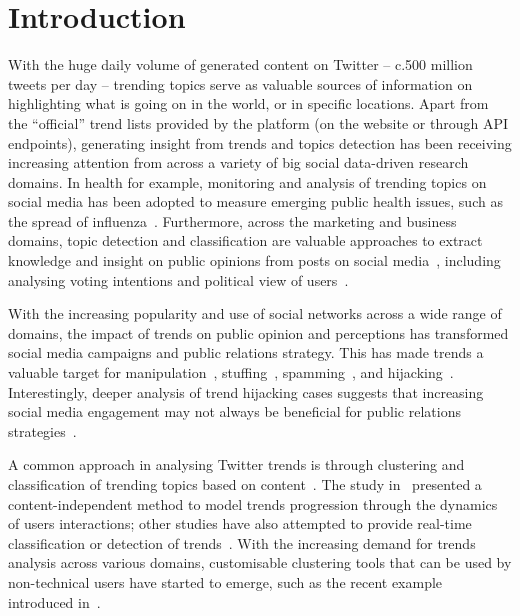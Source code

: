 \documentclass{llncs}
\begin{document}
\section{Introduction}\label{intro}

With the huge daily volume of generated content on Twitter -- c.500
million tweets per day -- trending topics serve as valuable sources of
information on highlighting what is going on in the world, or in
specific locations. Apart from the ``official'' trend lists provided
by the platform (on the website or through API endpoints), generating
insight from trends and topics detection has been receiving increasing
attention from across a variety of big social data-driven research
domains. In health for example, monitoring and analysis of trending
topics on social media has been adopted to measure emerging public
health issues, such as the spread of
influenza~\cite{Achrekar2011,Parker2013,Parker2015}. Furthermore,
across the marketing and business domains, topic detection and
classification are valuable approaches to extract knowledge and
insight on public opinions from posts on social
media~\cite{blamey-et-al-2012,Bello2013,albishry-et-al:ssei2018},
including analysing voting intentions and political view of
users~\cite{Fang2015}.

With the increasing popularity and use of social networks across a
wide range of domains, the impact of trends on public opinion and
perceptions has transformed social media campaigns and public
relations strategy. This has made trends a valuable target for
manipulation~\cite{Zhang2017}, stuffing~\cite{Irani2010},
spamming~\cite{Sedhai2015,Chu2012}, and
hijacking~\cite{VanDam2016}. Interestingly, deeper analysis of trend
hijacking cases suggests that increasing social media engagement may
not always be beneficial for public relations
strategies~\cite{Sanderson2016}.

A common approach in analysing Twitter trends is through clustering
and classification of trending topics based on
content~\cite{Zubiaga2011,Benhardus2013,Ferragina2015,albishry-et-al:iccci2017}.
The study in~\cite{TenThij2016} presented a content-independent method
to model trends progression through the dynamics of users
interactions; other studies have also attempted to provide real-time
classification or detection of
trends~\cite{Mathioudakis2010,Zubiaga2015}. With the increasing demand
for trends analysis across various domains, customisable clustering
tools that can be used by non-technical users have started to emerge,
such as the recent example introduced in~\cite{Arn2018}.
\end{document}
